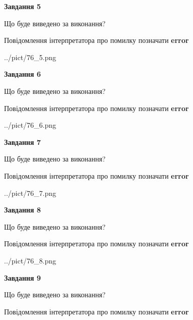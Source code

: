 \documentclass[11pt, ukrainian]{article}
\begin{document}
{\begin {large}
{\begin {center}\textbf{Завдання 5}\end {center}}\par
Що буде виведено за виконання? \par
Повідомлення інтерпретатора про помилку позначати \textbf{error}

\begin{center}
	{../pict/76_5.png}
\end{center}
\newpage

{\begin {center}\textbf{Завдання 6}\end {center}}\par
Що буде виведено за виконання? \par
Повідомлення інтерпретатора про помилку позначати \textbf{error}

\begin{center}
	{../pict/76_6.png}
\end{center}
\newpage

{\begin {center}\textbf{Завдання 7}\end {center}}\par
Що буде виведено за виконання? \par
Повідомлення інтерпретатора про помилку позначати \textbf{error}

\begin{center}
	{../pict/76_7.png}
\end{center}
\newpage

{\begin {center}\textbf{Завдання 8}\end {center}}\par
Що буде виведено за виконання? \par
Повідомлення інтерпретатора про помилку позначати \textbf{error}

\begin{center}
	{../pict/76_8.png}
\end{center}
\newpage

{\begin {center}\textbf{Завдання 9}\end {center}}\par
Що буде виведено за виконання? \par
Повідомлення інтерпретатора про помилку позначати \textbf{error}


\end{large}}
\end{document}
